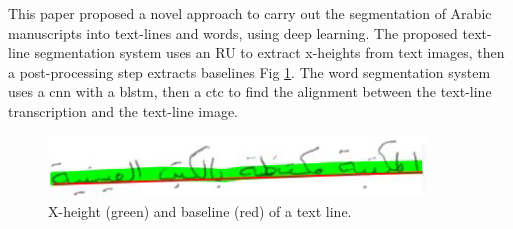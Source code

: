 This paper \cite{8892920} proposed a novel approach to carry out the segmentation of Arabic manuscripts into text-lines and words, using deep learning. The proposed text-line segmentation system uses an \acrshort{RU} to extract x-heights from text images, then a post-processing step extracts baselines Fig \ref{fig:X-height}. The word segmentation system uses a \acrshort{cnn} with a \acrshort{blstm}, then a \acrshort{ctc} to find the alignment between the text-line transcription and the text-line image.

\begin{figure}[!htb]
    \centering
    \includegraphics[width=10cm]{images/X-height.png}
    \caption{X-height (green) and baseline (red) of a text line.}
    \label{fig:X-height}
\end{figure}

